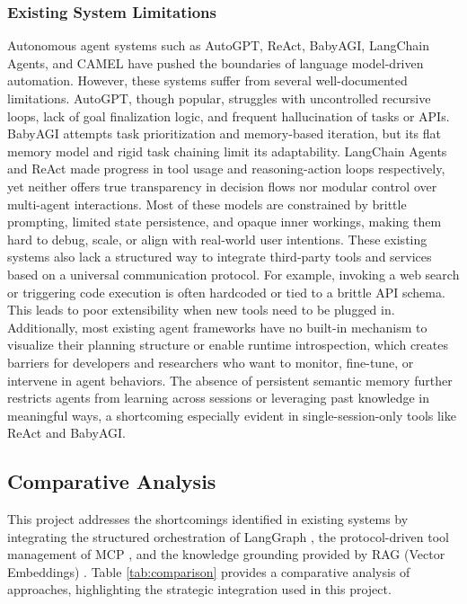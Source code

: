 \documentclass[lettersize,journal]{IEEEtran}
\begin{document}
\subsubsection{Existing System Limitations}
Autonomous agent systems such as AutoGPT, ReAct, BabyAGI, LangChain Agents, and CAMEL have pushed the boundaries of language model-driven automation. However, these systems suffer from several well-documented limitations. AutoGPT, though popular, struggles with uncontrolled recursive loops, lack of goal finalization logic, and frequent hallucination of tasks or APIs. BabyAGI attempts task prioritization and memory-based iteration, but its flat memory model and rigid task chaining limit its adaptability. LangChain Agents and ReAct made progress in tool usage and reasoning-action loops respectively, yet neither offers true transparency in decision flows nor modular control over multi-agent interactions. Most of these models are constrained by brittle prompting, limited state persistence, and opaque inner workings, making them hard to debug, scale, or align with real-world user intentions. These existing systems also lack a structured way to integrate third-party tools and services based on a universal communication protocol. For example, invoking a web search or triggering code execution is often hardcoded or tied to a brittle API schema. This leads to poor extensibility when new tools need to be plugged in. Additionally, most existing agent frameworks have no built-in mechanism to visualize their planning structure or enable runtime introspection, which creates barriers for developers and researchers who want to monitor, fine-tune, or intervene in agent behaviors. The absence of persistent semantic memory further restricts agents from learning across sessions or leveraging past knowledge in meaningful ways, a shortcoming especially evident in single-session-only tools like ReAct and BabyAGI.

\subsection{Comparative Analysis}

This project addresses the shortcomings identified in existing systems by integrating the structured orchestration of LangGraph \cite{wang2024agent}, the protocol-driven tool management of MCP \cite{krishnan2025advancing}, and the knowledge grounding provided by RAG (Vector Embeddings) \cite{lewis2020retrieval}. Table \ref{tab:comparison} provides a comparative analysis of approaches, highlighting the strategic integration used in this project.
\end{document}
